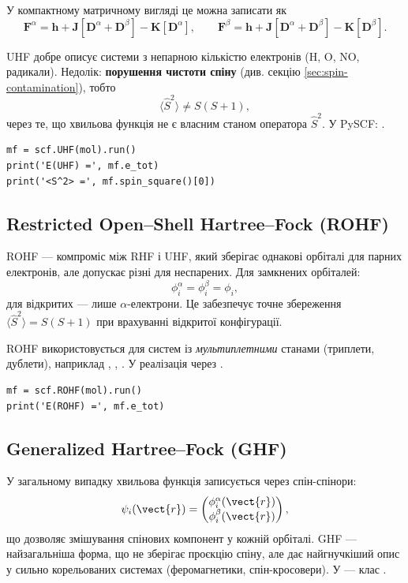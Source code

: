 У компактному матричному вигляді це можна записати як
\[
	\mathbf F^{\alpha}
	= \mathbf h + \mathbf J[\mathbf D^{\alpha}+\mathbf D^{\beta}]
	- \mathbf K[\mathbf D^{\alpha}],
	\qquad
	\mathbf F^{\beta}
	= \mathbf h + \mathbf J[\mathbf D^{\alpha}+\mathbf D^{\beta}]
	- \mathbf K[\mathbf D^{\beta}].
\]

UHF добре описує системи з непарною кількістю електронів (H, O, NO, радикали).
Недолік: \textbf{порушення чистоти спіну} (див. секцію \ref{sec:spin-contamination}), тобто
\[
	\langle \hat{S}^2 \rangle \neq S(S+1),
\]
через те, що хвильова функція не є власним станом оператора $\hat{S}^2$.
У PySCF: .

\begin{verbatim}
mf = scf.UHF(mol).run()
print('E(UHF) =', mf.e_tot)
print('<S^2> =', mf.spin_square()[0])
\end{verbatim}

\subsection{Restricted Open–Shell Hartree–Fock (ROHF)}

ROHF --- компроміс між RHF і UHF, який зберігає однакові орбіталі для парних електронів,
але допускає різні для неспарених.
Для замкнених орбіталей:
\[
	\phi_i^\alpha = \phi_i^\beta = \phi_i,
\]
для відкритих --- лише $\alpha$-електрони.
Це забезпечує точне збереження $\langle \hat{S}^2 \rangle = S(S+1)$ при врахуванні відкритої конфігурації.

ROHF використовується для систем із \emph{мультиплетними} станами (триплети, дублети), наприклад , , .
У \PySCF{} реалізація через .

\begin{verbatim}
mf = scf.ROHF(mol).run()
print('E(ROHF) =', mf.e_tot)
\end{verbatim}

\subsection{Generalized Hartree–Fock (GHF)}

У загальному випадку хвильова функція записується через спін-спінори:
\[
	\psi_i(\vect{r}) =
	\begin{pmatrix}
		\phi_i^\alpha(\vect{r}) \\
		\phi_i^\beta(\vect{r})
	\end{pmatrix},
\]
що дозволяє змішування спінових компонент у кожній орбіталі.
GHF --- найзагальніша форма, що не зберігає проєкцію спіну, але дає найгнучкіший опис у сильно корельованих системах (феромагнетики, спін-кросовери).
У \PySCF{} --- клас .


